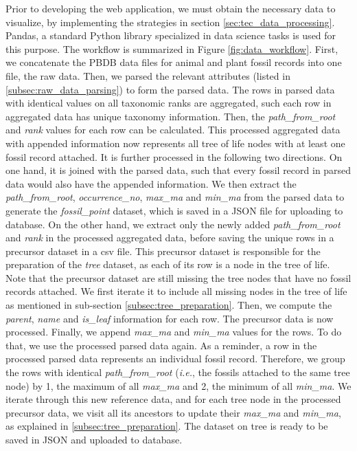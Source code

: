 \documentclass[11pt, a4paper,oneside,chapterprefix=false]{scrbook}
\begin{document}
Prior to developing the web application, we must obtain the necessary data to visualize, by implementing the strategies in section \ref{sec:tec_data_processing}. Pandas, a standard Python library specialized in data science tasks is used for this purpose. The workflow is summarized in Figure \ref{fig:data_workflow}.  First, we concatenate the PBDB \cite{peters2016paleobiology} data files for animal and plant fossil records into one file, the raw data. Then, we parsed the relevant attributes (listed in \ref{subsec:raw_data_parsing}) to form the parsed data. The rows in parsed data with identical values on all taxonomic ranks are aggregated, such each row in aggregated data has unique taxonomy information. Then, the \emph{path\_from\_root} and \emph{rank} values for each row can be calculated. This processed aggregated data with appended information now represents all tree of life nodes with at least one fossil record attached. It is further processed in the following two directions. On one hand, it is joined with the parsed data, such that every fossil record in parsed data would also have the appended information. We then extract the \emph{path\_from\_root}, \emph{occurrence\_no}, \emph{max\_ma} and \emph{min\_ma} from the parsed data to generate the \emph{fossil\_point} dataset, which is saved in a JSON file for uploading to database. On the other hand, we extract only the newly added \emph{path\_from\_root} and \emph{rank} in the processed aggregated data, before saving the unique rows in a precursor dataset in a csv file. This precursor dataset is responsible for the preparation of the \emph{tree} dataset, as each of its row is a node in the tree of life. Note that the precursor dataset are still missing the tree nodes that have no fossil records attached. We first iterate it to include all missing nodes in the tree of life as mentioned in sub-section \ref{subsec:tree_preparation}. Then, we compute the \emph{parent}, \emph{name} and \emph{is\_leaf} information for each row. The precursor data is now processed. Finally, we append \emph{max\_ma} and \emph{min\_ma} values for the rows. To do that, we use the processed parsed data again. As a reminder, a row in the processed parsed data represents an individual fossil record. Therefore, we group the rows with identical \emph{path\_from\_root} (\emph{i.e.}, the fossils attached to the same tree node) by 1, the maximum of all \emph{max\_ma} and 2, the minimum of all \emph{min\_ma}. We iterate through this new reference data, and for each tree node in the processed precursor data, we visit all its ancestors to update their \emph{max\_ma} and \emph{min\_ma}, as explained in \ref{subsec:tree_preparation}. The dataset on tree is ready to be saved in JSON and uploaded to database. \\
\end{document}

